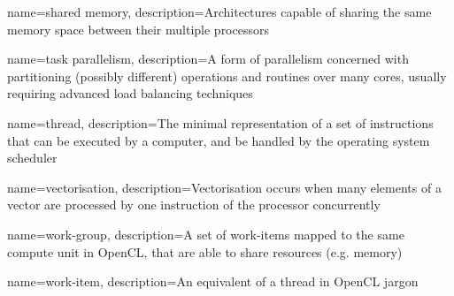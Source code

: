 {
    name={shared memory},
    description={Architectures capable of sharing the same memory space between their multiple processors}
}

{
    name={task parallelism},
    description={A form of parallelism concerned with partitioning (possibly different) operations and routines over many cores, usually requiring advanced load balancing techniques~\cite{tsuchiyama2010opencl}}
}

{
    name=thread,
    description={The minimal representation of a set of instructions that can be executed by a computer, and be handled by the operating system scheduler}
}

{
    name=vectorisation,
    description={Vectorisation occurs when many elements of a vector are processed by one instruction of the processor concurrently}
}

{
    name={work-group},
    description={A set of work-items mapped to the same compute unit in OpenCL, that are able to share resources (e.g. memory)}
}

{
    name={work-item},
    description={An equivalent of a thread in OpenCL jargon}
}


